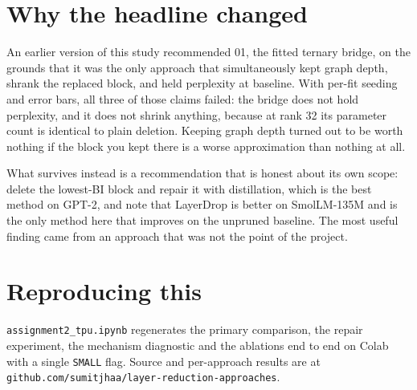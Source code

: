 \documentclass[11pt]{article}
\begin{document}
\section{Why the headline changed}
An earlier version of this study recommended 01, the fitted ternary bridge, on
the grounds that it was the only approach that simultaneously kept graph
depth, shrank the replaced block, and held perplexity at baseline. With
per-fit seeding and error bars, all three of those claims failed: the bridge
does not hold perplexity, and it does not shrink anything, because at
rank 32 its parameter count is identical to plain deletion. Keeping graph
depth turned out to be worth nothing if the block you kept there is a worse
approximation than nothing at all.

What survives instead is a recommendation that is honest about its own scope:
delete the lowest-BI block and repair it with distillation, which is the best
method on GPT-2, and note that LayerDrop is better on SmolLM-135M and is the
only method here that improves on the unpruned baseline. The most useful
finding came from an approach that was not the point of the project.

\section*{Reproducing this}
\texttt{assignment2\_tpu.ipynb} regenerates the primary comparison, the
repair experiment, the mechanism diagnostic and the ablations end to end on
Colab with a single \texttt{SMALL} flag. Source and per-approach results are
at \texttt{github.com/sumitjhaa/layer-reduction-approaches}.
\end{document}
